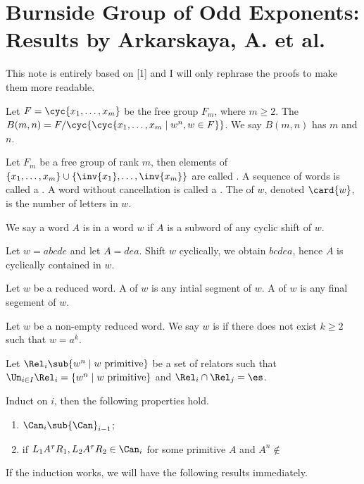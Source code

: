 \section{Burnside Group of Odd Exponents: Results by Arkarskaya, A. et al.}
\par
This note is entirely based on [1] and I will only rephrase the proofs to make them more readable.
\begin{definition}
    Let $F=\cyc{{x}_{1},\dots,{x}_{m}}$ be the free group ${F}_{m}$, where $m\ge 2$. The  $B(m,n)=F/\cyc{\cyc{{x}_{1},\dots,{x}_{m}\mid{w}^{n},w\in F}}$. We say $B(m,n)$ has  $m$ and  $n$.
\end{definition}
\begin{definition}
    Let ${F}_{m}$ be a free group of rank $m$, then elements of $\{{x}_{1},\dots,{x}_{m}\}\cup\{\inv{{x}_{1}},\dots,\inv{{x}_{m}}\}$ are called . A sequence of words is called a . A word without cancellation is called a . The  of $w$, denoted $\card{w}$, is the number of letters in $w$.
\end{definition}
\begin{definition}
    We say a word $A$ is  in a word $w$ if $A$ is a subword of any cyclic shift of $w$.
\end{definition}
\begin{example}
    Let $w=abcde$ and let $A=dea$. Shift $w$ cyclically, we obtain $bcdea$, hence $A$ is cyclically contained in $w$.
\end{example}
\begin{definition}
    Let $w$ be a reduced word. A  of $w$ is any intial segment of $w$. A  of $w$ is any final segement of $w$.
\end{definition}
\begin{definition}
    Let $w$ be a non-empty reduced word. We say $w$ is  if there does not exist $k\ge 2$ such that $w={a}^{k}$.
\end{definition}
\begin{definition}
    Let ${\Rel}_{i}\sub\{{w}^{n}\mid w\ \text{primitive}\}$ be a set of relators such that ${\Un}_{i\in I}{\Rel}_{i}=\{{w}^{n}\mid w\ \text{primitive}\}$ and ${\Rel}_{i}\cap{\Rel}_{j}=\es$.
\end{definition}
\newpage


\begin{theorem}
    Induct on $i$, then the following properties hold.
    \begin{enumerate}
        \item ${\Can}_{i}\sub{\Can}_{i-1}$;
        \item if ${L}_{1}{A}^{\tau}{R}_{1},{L}_{2}{A}^{\tau}{R}_{2}\in{\Can}_{i}$ for some primitive $A$ and ${A}^{n}\notin$
    \end{enumerate}
\end{theorem}




\par
If the induction works, we will have the following results immediately.
\begin{theorem}
    
\end{theorem}